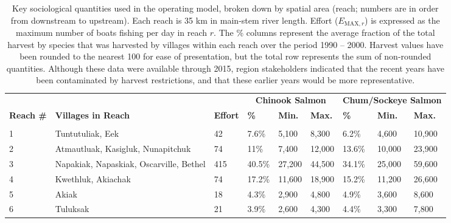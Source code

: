 \documentclass[12pt,]{book}
\theoremstyle{definition}
\theoremstyle{definition}
\theoremstyle{definition}
\theoremstyle{remark}
\begin{document}
\begin{landscape}\begin{table}

\caption{\label{tab:socio-spatial-table}Key sociological quantities used in the operating model, broken down by spatial area (reach; numbers are in order from downstream to upstream). Each reach is 35 km in main-stem river length. Effort ($E_{\text{MAX},r}$) is expressed as the maximum number of boats fishing per day in reach $r$. The \% columns represent the average fraction of the total harvest by species that was harvested by villages within each reach over the period 1990 -- 2000. Harvest values have been rounded to the nearest 100 for ease of presentation, but the total row represents the sum of non-rounded quantities. Although these data were available through 2015, region stakeholders indicated that the recent years have been contaminated by harvest restrictions, and that these earlier years would be more representative.}
\centering
\begin{tabular}[t]{lllllllll}
\toprule
\multicolumn{1}{c}{\bfseries } & \multicolumn{1}{c}{\bfseries } & \multicolumn{1}{c}{\bfseries } & \multicolumn{3}{c}{\bfseries Chinook Salmon} & \multicolumn{3}{c}{\bfseries Chum/Sockeye Salmon} \\
\cmidrule(l{2pt}r{2pt}){4-6} \cmidrule(l{2pt}r{2pt}){7-9}
\textbf{Reach \#} & \textbf{Villages in Reach} & \textbf{Effort} & \textbf{\%} & \textbf{Min.} & \textbf{Max.} & \textbf{\%} & \textbf{Min.} & \textbf{Max.}\\
\midrule
\addlinespace[0.3em]
\multicolumn{9}{l}{\textbf{Lower River}}\\
\hline
\hspace{1em}1 & Tuntutuliak, Eek & 42 & 7.6\% & 5,100 & 8,300 & 6.2\% & 4,600 & 10,900\\
\hspace{1em}2 & Atmautluak, Kasigluk, Nunapitchuk & 74 & 11\% & 7,400 & 12,000 & 13.6\% & 10,000 & 23,900\\
\hspace{1em}3 & Napakiak, Napaskiak, Oscarville, Bethel & 415 & 40.5\% & 27,200 & 44,500 & 34.1\% & 25,000 & 59,600\\
\hspace{1em}4 & Kwethluk, Akiachak & 74 & 17.2\% & 11,600 & 18,900 & 15.2\% & 11,200 & 26,600\\
\hspace{1em}5 & Akiak & 18 & 4.3\% & 2,900 & 4,800 & 4.9\% & 3,600 & 8,600\\
\hspace{1em}6 & Tuluksak & 21 & 3.9\% & 2,600 & 4,300 & 4.4\% & 3,300 & 7,800\\

\end{tabular}
\end{table}
\end{landscape}
\end{document}
